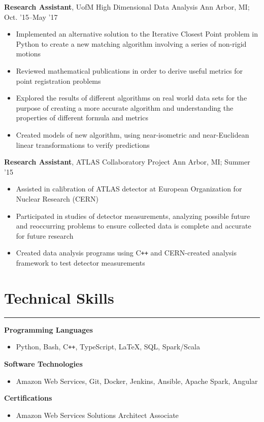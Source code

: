 \documentclass[11pt]{article}
\newcommand{\resumesection}[1]{\vspace{-0.5cm}\section*{\LARGE#1}\vspace{-0.2cm}\hrule\vspace{0.2cm}}
\begin{document}
\textbf{Research Assistant}, UofM High Dimensional Data Analysis \hfill Ann Arbor, MI; Oct. '15--May '17
\begin{itemize}
  \item Implemented an alternative solution to the Iterative Closest Point problem in Python to create a new matching algorithm involving a series of non-rigid motions
  \item Reviewed mathematical publications in order to derive useful metrics for point registration problems
  \item Explored the results of different algorithms on real world data sets for the purpose of creating a more accurate algorithm and understanding the properties of different formula and metrics
  \item Created models of new algorithm, using near-isometric and near-Euclidean linear transformations to verify predictions
\end{itemize}

\textbf{Research Assistant}, ATLAS Collaboratory Project \hfill Ann Arbor, MI; Summer '15
\begin{itemize}
  \item Assisted in calibration of ATLAS detector at European Organization for Nuclear Research (CERN)
  \item Participated in studies of detector measurements, analyzing possible future and reoccurring problems to ensure collected data is complete and accurate for future research
  \item Created data analysis programs using C\texttt{++} and CERN-created analysis framework to test detector measurements
\end{itemize}

\vspace{0.2cm}
\resumesection{Technical Skills}

\textbf{Programming Languages}
\begin{itemize}
  \item Python, Bash, C\texttt{++}, TypeScript, \LaTeX, SQL, Spark/Scala
\end{itemize}

\textbf{Software Technologies}
\begin{itemize}
  \item{Amazon Web Services, Git, Docker, Jenkins, Ansible, Apache Spark, Angular}
\end{itemize}

\textbf{Certifications}
\begin{itemize}
  \item{Amazon Web Services Solutions Architect Associate}
\end{itemize}
\end{document}
